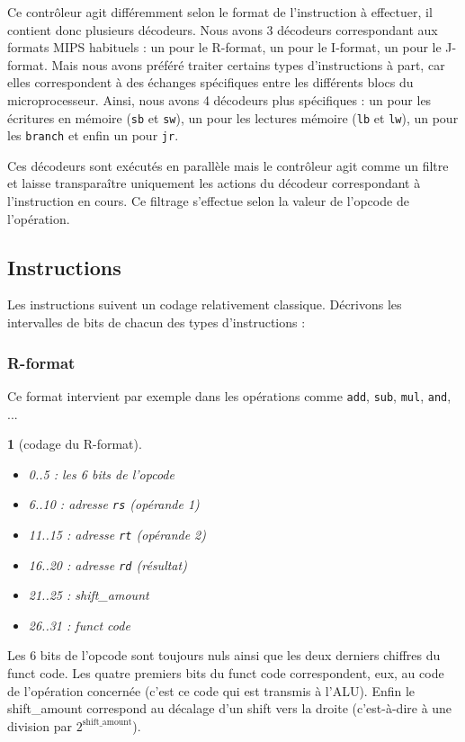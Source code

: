 \documentclass[13pt]{article}
\newtheorem{format}{  }
\begin{document}
Ce contrôleur agit différemment selon le format de l’instruction à effectuer, il
contient donc plusieurs décodeurs. Nous avons 3 décodeurs correspondant aux
formats MIPS habituels : un pour le R-format, un pour le I-format, un pour le
J-format. Mais nous avons préféré traiter certains types d'instructions à part,
car elles correspondent à des échanges spécifiques entre les différents blocs du
microprocesseur. Ainsi, nous avons 4 décodeurs plus spécifiques : un pour les
écritures en mémoire (\texttt{sb} et \texttt{sw}), un pour les lectures mémoire
(\texttt{lb} et \texttt{lw}), un pour les \texttt{branch} et enfin un pour
\texttt{jr}. 

Ces décodeurs sont exécutés en parallèle mais le contrôleur agit comme un filtre
et laisse transparaître uniquement les actions du décodeur correspondant à l'instruction en cours.
Ce filtrage s'effectue selon la valeur de l'opcode de l'opération.

\subsection{Instructions}

Les instructions suivent un codage relativement classique.
Décrivons les intervalles de bits de chacun des types d'instructions :


\subsubsection{R-format}

Ce format intervient par exemple dans les opérations 
comme \texttt{add}, \texttt{sub}, \texttt{mul}, \texttt{and}, ...

\begin{format}[codage du R-format]
  \begin{itemize}
  \item 0..5 : les 6 bits de l'opcode
  \item 6..10 : adresse \texttt{rs} (opérande 1)
  \item 11..15 : adresse \texttt{rt} (opérande 2)
  \item 16..20 : adresse \texttt{rd} (résultat)
  \item 21..25 : shift\_amount
  \item 26..31 : funct code
  \end{itemize}
\end{format}

Les 6 bits de l'opcode sont toujours nuls ainsi que les deux derniers chiffres
du funct code. Les quatre premiers bits du funct code correspondent, eux, au
code de l'opération concernée (c'est ce code qui est transmis à l'ALU). Enfin le
shift\_amount correspond au décalage d'un shift vers la droite (c'est-à-dire à
une division par $2^{\text{shift\_amount}}$).
\end{document}
